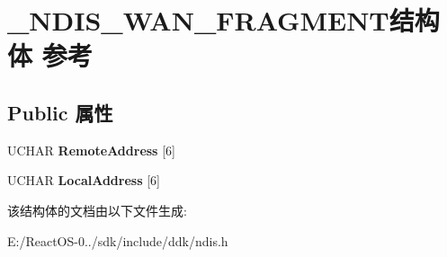 \hypertarget{struct___n_d_i_s___w_a_n___f_r_a_g_m_e_n_t}{}\section{\+\_\+\+N\+D\+I\+S\+\_\+\+W\+A\+N\+\_\+\+F\+R\+A\+G\+M\+E\+N\+T结构体 参考}
\label{struct___n_d_i_s___w_a_n___f_r_a_g_m_e_n_t}
\subsection*{Public 属性}
\begin{DoxyCompactItemize}
\item 
\mbox{\label{struct___n_d_i_s___w_a_n___f_r_a_g_m_e_n_t_a89977dee8817a82d557f8a1eedec1caa}} 
U\+C\+H\+AR {\bfseries Remote\+Address} \mbox{[}6\mbox{]}
\item 
\mbox{\label{struct___n_d_i_s___w_a_n___f_r_a_g_m_e_n_t_aba3b3edc7a94dddaf05e0b019c9d8c6a}} 
U\+C\+H\+AR {\bfseries Local\+Address} \mbox{[}6\mbox{]}
\end{DoxyCompactItemize}


该结构体的文档由以下文件生成\+:\begin{DoxyCompactItemize}
\item 
E\+:/\+React\+O\+S-\/0../sdk/include/ddk/ndis.\+h\end{DoxyCompactItemize}
